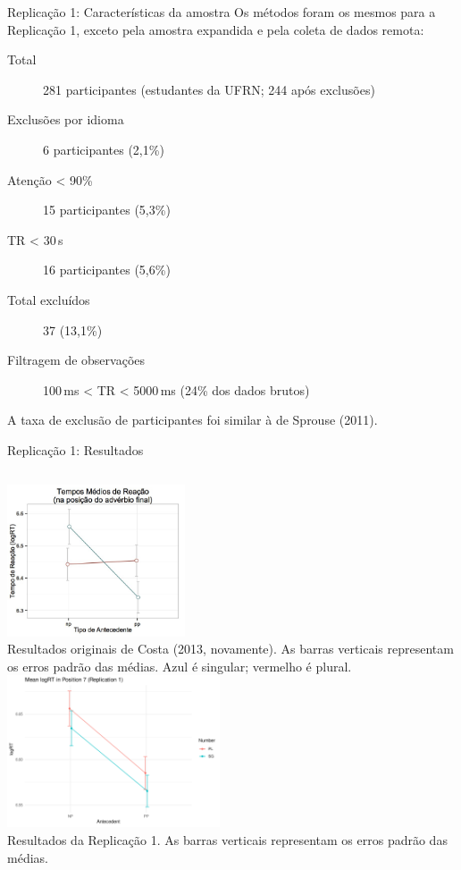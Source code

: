 \documentclass[numbering=fraction,aspectratio=169]{beamer}
\newcommand{\FigureCaption}[1]{{\scriptsize #1}}
\begin{document}
\begin{frame}{Replicação 1: Características da amostra}
  Os métodos foram os mesmos para a Replicação 1, exceto pela \alert{amostra expandida} e pela \alert{coleta de dados remota}:

  \begin{description}
  \item[Total] 281 participantes (estudantes da UFRN; \alert{244 após exclusões})
  \item[Exclusões por idioma] 6 participantes (2,1\%)
  \item[Atenção < 90\%] 15 participantes (5,3\%)
  \item[TR < 30\,s] 16 participantes (5,6\%)
  \item[Total excluídos] 37 (13,1\%)
  \item[Filtragem de observações] 100\,ms < TR < 5000\,ms (24\% dos dados brutos)
  \end{description}

  A taxa de exclusão de participantes foi similar à de Sprouse (2011).
\end{frame}

\begin{frame}{Replicação 1: Resultados}
  \begin{columns}
    \centering
    \includegraphics[height=4.5cm]{img/costa2013-results}\\
    \FigureCaption{Resultados originais de Costa (2013, novamente). As barras verticais representam os erros padrão das médias. Azul é singular; vermelho é plural.}
    \centering
    \includegraphics[height=4.5cm]{img/R1-results}\\
    \FigureCaption{Resultados da Replicação 1. As barras verticais representam os erros padrão das médias.}
  \end{columns}
\end{frame}
\end{document}
